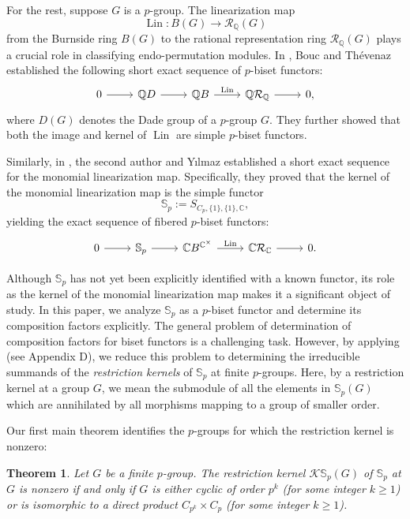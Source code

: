 \documentclass[12pt]{article}
\theoremstyle{plain}
\newtheorem{theorem}{Theorem}[section]
\theoremstyle{definition}
\newcommand{\kerlin}{\mathbb S_p}
\begin{document}
For the rest, suppose $G$ is a $p$-group. The linearization map 
\[
\operatorname{Lin} \colon B(G) \to \mathcal{R}_{\mathbb{Q}}(G)
\]
from the Burnside ring \( B(G) \) to the rational representation ring \( \mathcal{R}_{\mathbb{Q}}(G) \) plays a crucial role in classifying endo-permutation modules. In \cite{BoTh}, Bouc and Th{\'e}venaz established the following short exact sequence of \( p \)-biset functors:
\[
\begin{tikzcd}
0 \arrow[r] & \mathbb{Q}D \arrow[r] & \mathbb{Q}B \arrow[r, "\operatorname{Lin}"] & \mathbb{Q}\mathcal{R}_{\mathbb{Q}} \arrow[r] & 0,
\end{tikzcd}
\]
where \( D(G) \) denotes the Dade group of a \( p \)-group \( G \). They further showed that both the image and kernel of \( \operatorname{Lin} \) are simple \( p \)-biset functors.

Similarly, in \cite{CoYi}, the second author and Yılmaz established a short exact sequence for the monomial linearization map. Specifically, they proved that the kernel of the monomial linearization map is the simple functor 
\[
\kerlin := S_{C_p, \{1\}, \{1\}, \mathbb{C}},
\]
yielding the exact sequence of fibered \( p \)-biset functors:
\[
\begin{tikzcd}
0 \arrow[r] & \kerlin \arrow[r] & \mathbb{C}B^{\mathbb{C}^\times} \arrow[r, "\operatorname{Lin}"] & \mathbb{C}\mathcal{R}_{\mathbb{C}} \arrow[r] & 0.
\end{tikzcd}
\]

Although \( \kerlin \) has not yet been explicitly identified with a known functor, its role as the kernel of the monomial linearization map makes it a significant object of study. In this paper, we analyze \( \kerlin \) as a \( p \)-biset functor and determine its composition factors explicitly. The general problem of determination of composition factors for biset functors is a challenging task. However, by applying \cite[Theorem 2.5]{BCK} (see Appendix D), we reduce this problem to determining the irreducible summands of the \emph{restriction kernels} of \( \kerlin \) at finite $p$-groups. Here, by a restriction kernel at a group $G$, we mean the submodule of all the elements in $\kerlin(G)$ which are annihilated by all morphisms mapping to a group of smaller order.

Our first main theorem identifies the \( p \)-groups for which the restriction kernel is nonzero:
\begin{theorem}\label{thm:main1}
    Let \( G \) be a finite \( p \)-group. The restriction kernel \( \mathcal{K}\kerlin(G) \) of \( \kerlin \) at \( G \) is nonzero if and only if \( G \) is either cyclic of order \( p^k \) (for some integer \( k \geq 1 \)) or is isomorphic to a direct product \( C_{p^k} \times C_p \) (for some integer \( k \geq 1 \)).
\end{theorem}
\end{document}

